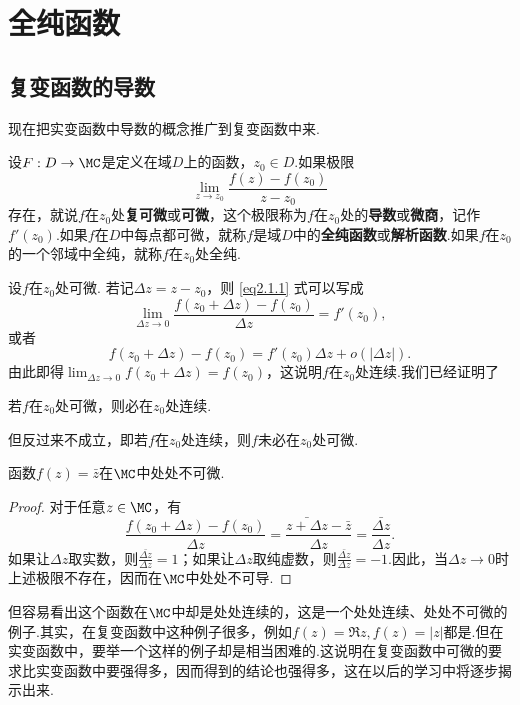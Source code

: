 \setcounter{chapter}{1}
\chapter{全纯函数\label{chap2}}
\section{复变函数的导数\label{sec2.1}}
现在把实变函数中导数的概念推广到复变函数中来.
\begin{definition}
设$F:D\to\MC$是定义在域$D$上的函数，$z_0\in D$.如果极限
\begin{equation}\label{eq2.1.1}
 \lim_{z\to z_0}\frac{f(z)-f(z_0)}{z-z_0}
\end{equation}
存在，就说$f$在$z_0$处\textbf{复可微}或\textbf{可微}，这个极限称为$f$在$z_0$处的\textbf{导数}或\textbf{微商}，记作$f'(z_0)$.如果$f$在$D$中每点都可微，就称$f$是域$D$中的\textbf{全纯函数}或\textbf{解析函数}.如果$f$在$z_0$的一个邻域中全纯，就称$f$在$z_0$处全纯.
\end{definition}

设$f$在$z_0$处可微. 若记$\Delta z=z-z_0$，则 \eqref{eq2.1.1} 式可以写成
\[\lim_{\Delta z\to0}\frac{f(z_0+\Delta z)-f(z_0)}{\Delta z}=f'(z_0),\]
或者
\begin{equation}\label{eq2.1.2}
f(z_0+\Delta z)-f(z_0)=f'(z_0)\Delta z+o(|\Delta z|).
\end{equation}
由此即得$\lim_{\Delta z\to0}f(z_0+\Delta z)=f(z_0)$，这说明$f$在$z_0$处连续.我们已经证明了
\begin{prop}\label{prop2.1.2}
  若$f$在$z_0$处可微，则必在$z_0$处连续.
\end{prop}

但反过来不成立，即若$f$在$z_0$处连续，则$f$未必在$z_0$处可微.

\begin{example}
函数$f(z)=\bar z$在$\MC$中处处不可微.
\end{example}
\begin{proof}
对于任意$z\in\MC$，有
 \[\frac{f(z_0+\Delta z)-f(z_0)}{\Delta z}=\frac{\bar{z+\Delta z}-\bar z}{\Delta z}=\frac{\bar{\Delta z}}{\Delta z}.\]
 如果让$\Delta z$取实数，则$\frac{\bar{\Delta z}}{\Delta z}=1$；如果让$\Delta z$取纯虚数，则$\frac{\bar{\Delta z}}{\Delta z}=-1$.因此，当$\Delta z\to0$时上述极限不存在，因而在$\MC$中处处不可导.
\end{proof}

但容易看出这个函数在$\MC$中却是处处连续的，这是一个处处连续、处处不可微的例子.其实，在复变函数中这种例子很多，例如$f(z)=\Re z,f(z)=|z|$都是.但在实变函数中，要举一个这样的例子却是相当困难的.这说明在复变函数中可微的要求比实变函数中要强得多，因而得到的结论也强得多，这在以后的学习中将逐步揭示出来.

